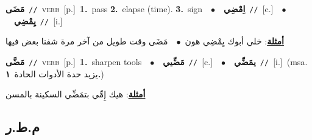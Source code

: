 \documentclass[10pt,a4paper,twoside]{article} %
\begin{document}
\begin{multicols}{2}
{\setlength\topsep{0pt}\textbf{\foreignlanguage{arabic}{مَضَى}}\ {\color{gray}\texttt{//}\color{black}}\ \textsc{verb}\ [p.]\ \textbf{1.}~pass  \textbf{2.}~elapse (time).  \textbf{3.}~sign\ \ $\bullet$\ \ \setlength\topsep{0pt}\textbf{\foreignlanguage{arabic}{اِمْضِي}}\ {\color{gray}\texttt{//}\color{black}}\ [c.]\ \ $\bullet$\ \ \setlength\topsep{0pt}\textbf{\foreignlanguage{arabic}{يِمْضِي}}\ {\color{gray}\texttt{//}\color{black}}\ [i.]\  \begin{flushright}\color{gray}\foreignlanguage{arabic}{\textbf{\underline{\foreignlanguage{arabic}{أمثلة}}}: خلي أبوك يِمْضِي هون\ $\bullet$\ \  مَضَى وقت طويل من آخر مرة شفنا بعض فيها}\end{flushright}\color{black}} \vspace{2mm}

{\setlength\topsep{0pt}\textbf{\foreignlanguage{arabic}{مَضَّى}}\ {\color{gray}\texttt{//}\color{black}}\ \textsc{verb}\ [p.]\ \textbf{1.}~sharpen tools\ \ $\bullet$\ \ \setlength\topsep{0pt}\textbf{\foreignlanguage{arabic}{مَضِّيي}}\ {\color{gray}\texttt{//}\color{black}}\ [c.]\ \ $\bullet$\ \ \setlength\topsep{0pt}\textbf{\foreignlanguage{arabic}{يمَضِّي}}\ {\color{gray}\texttt{//}\color{black}}\ [i.]\ \color{gray}(msa. \foreignlanguage{arabic}{يزيد حدة الأدوات الحادة}~\foreignlanguage{arabic}{\textbf{١.}})\color{black}\  \begin{flushright}\color{gray}\foreignlanguage{arabic}{\textbf{\underline{\foreignlanguage{arabic}{أمثلة}}}: هيك إِمِّي بتمَضِّي السكينة بالمسن}\end{flushright}\color{black}} \vspace{2mm}

\vspace{-3mm}
\subsection*{\color{blue}\foreignlanguage{arabic}{م.ط.ر}\color{blue}{}} 


\end{multicols}
\end{document}
